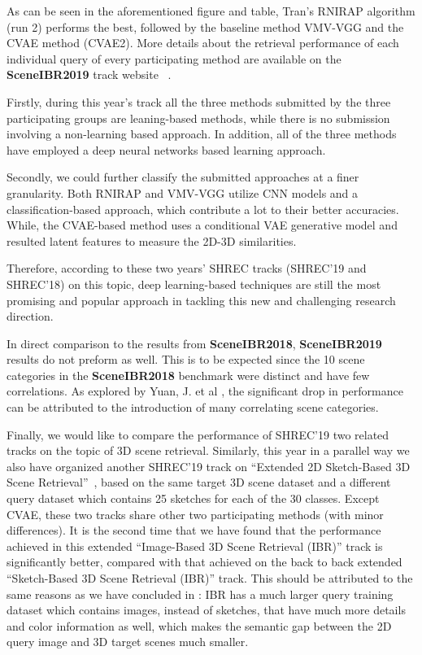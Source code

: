 \documentclass[../main.tex]{subfiles}
\begin{document}
As can be seen in the aforementioned figure and table, Tran's RNIRAP algorithm 
(run 2) performs the best, followed by the baseline method VMV-VGG and the CVAE 
method (CVAE2). More details about the retrieval performance of each individual 
query of every participating method are available on the \textbf{SceneIBR2019} 
track website~\cite{SceneIBR19} . 

Firstly, during this year's track all the three methods submitted by the three 
participating groups are leaning-based methods, while there is no submission 
involving a non-learning based approach. In addition, all of the three methods 
have employed a deep neural networks based learning approach. 

Secondly, we could further classify the submitted approaches at a finer granularity. Both RNIRAP and VMV-VGG utilize CNN models and a classification-based approach, which contribute a lot to their better accuracies. While, the CVAE-based method uses a conditional VAE generative model and resulted latent features to measure the 2D-3D similarities. 

Therefore, according to these two years' SHREC tracks (SHREC'19 and SHREC'18) on this topic, deep learning-based techniques are still the most promising and popular approach in tackling this new and challenging research direction.

In direct comparison to the results from \textbf{SceneIBR2018}, 
\textbf{SceneIBR2019} results do not preform as well. This is to be expected 
since the 10 scene categories in the \textbf{SceneIBR2018} benchmark were 
distinct and have few correlations. As explored by Yuan, J. et al \cite{MIPR}, 
the significant drop in performance can be attributed to the introduction of 
many correlating scene categories. 


Finally, we would like to compare the performance of SHREC'19 two related 
tracks on the topic of 3D scene retrieval. Similarly, this year in a parallel 
way we also have organized another SHREC'19 track on ``Extended 2D Sketch-Based 
3D Scene Retrieval''~\cite{SceneIBR19}, based on the same target 3D scene 
dataset and a different query dataset which contains 25 sketches for each of 
the 30 classes. Except CVAE, these two tracks share other two participating 
methods (with minor differences). It is the second time 
that we have found that the performance achieved in this 
extended ``Image-Based 3D Scene Retrieval 
(IBR)'' track is significantly better, compared with that achieved on the back 
to back extended ``Sketch-Based 3D Scene Retrieval (IBR)'' track. This should 
be attributed to the same reasons as we 
have concluded in \cite{SceneIBR18Journal}: IBR has a 
much larger query training dataset which contains images, instead of sketches, 
that have much more details and color information as well, which makes the 
semantic gap between the 2D query image and 3D target scenes much smaller.  
\end{document}
